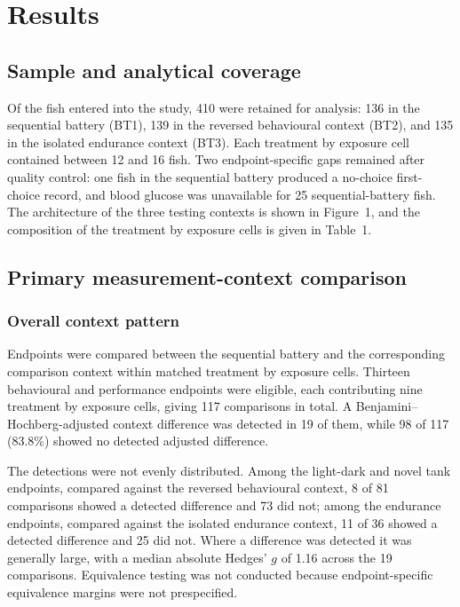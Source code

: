 \documentclass[12pt,a4paper]{article}
\begin{document}
\section{Results}
\label{sec:results}

\subsection{Sample and analytical coverage}
\label{sec-sample}

Of the fish entered into the study, 410 were retained for analysis: 136 in the sequential battery (BT1), 139 in the reversed behavioural context (BT2), and 135 in the isolated endurance context (BT3). Each treatment by exposure cell contained between 12 and 16 fish. Two endpoint-specific gaps remained after quality control: one fish in the sequential battery produced a no-choice first-choice record, and blood glucose was unavailable for 25 sequential-battery fish. The architecture of the three testing contexts is shown in Figure~1, and the composition of the treatment by exposure cells is given in Table~1.

\subsection{Primary measurement-context comparison}
\label{sec-context}

\subsubsection{Overall context pattern}
\label{sec-3-2-1}

Endpoints were compared between the sequential battery and the corresponding comparison context within matched treatment by exposure cells. Thirteen behavioural and performance endpoints were eligible, each contributing nine treatment by exposure cells, giving 117 comparisons in total. A Benjamini--Hochberg-adjusted context difference was detected in 19 of them, while 98 of 117 (83.8\%) showed no detected adjusted difference.

The detections were not evenly distributed. Among the light-dark and novel tank endpoints, compared against the reversed behavioural context, 8 of 81 comparisons showed a detected difference and 73 did not; among the endurance endpoints, compared against the isolated endurance context, 11 of 36 showed a detected difference and 25 did not. Where a difference was detected it was generally large, with a median absolute Hedges' $g$ of 1.16 across the 19 comparisons. Equivalence testing was not conducted because endpoint-specific equivalence margins were not prespecified.
\end{document}
